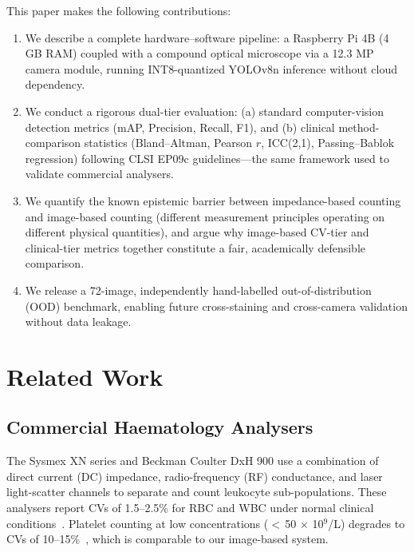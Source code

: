 \documentclass[10pt,conference]{IEEEtran}
\begin{document}
This paper makes the following contributions:
\begin{enumerate}
  \item We describe a complete hardware–software pipeline: a Raspberry Pi 4B (4 GB RAM) coupled with a compound optical microscope via a 12.3 MP camera module, running INT8-quantized YOLOv8n inference without cloud dependency.
  \item We conduct a rigorous dual-tier evaluation: (a) standard computer-vision detection metrics (mAP, Precision, Recall, F1), and (b) clinical method-comparison statistics (Bland–Altman, Pearson $r$, ICC(2,1), Passing--Bablok regression) following CLSI EP09c guidelines—the same framework used to validate commercial analysers.
  \item We quantify the known epistemic barrier between impedance-based counting and image-based counting (different measurement principles operating on different physical quantities), and argue why image-based CV-tier and clinical-tier metrics together constitute a fair, academically defensible comparison.
  \item We release a 72-image, independently hand-labelled out-of-distribution (OOD) benchmark, enabling future cross-staining and cross-camera validation without data leakage.
\end{enumerate}

\section{Related Work}
\label{sec:related}

\subsection{Commercial Haematology Analysers}
The Sysmex XN series and Beckman Coulter DxH 900 use a combination of direct current (DC) impedance, radio-frequency (RF) conductance, and laser light-scatter channels to separate and count leukocyte sub-populations. These analysers report CVs of 1.5–2.5\% for RBC and WBC under normal clinical conditions~\cite{sysmex2020}. Platelet counting at low concentrations ($<$\,50 $\times$ 10$^9$/L) degrades to CVs of 10–15\%~\cite{briggs2009}, which is comparable to our image-based system.
\end{document}
